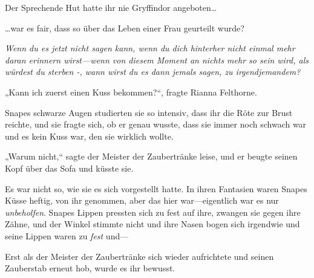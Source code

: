 Der Sprechende Hut hatte ihr nie Gryffindor angeboten…

…war es fair, dass so über das Leben einer Frau geurteilt wurde?

\emph{Wenn du es jetzt nicht sagen kann, wenn du dich hinterher nicht einmal mehr daran erinnern wirst—wenn von diesem Moment an nichts mehr so sein wird, als würdest du sterben -, wann wirst du es dann jemals sagen, zu irgendjemandem?}

„Kann ich zuerst einen Kuss bekommen?“, fragte Rianna Felthorne.

Snapes schwarze Augen studierten sie so intensiv, dass ihr die Röte zur Brust reichte, und sie fragte sich, ob er genau wusste, dass sie immer noch schwach war und es kein Kuss war, den sie wirklich wollte.

„Warum nicht,“ sagte der Meister der Zaubertränke leise, und er beugte seinen Kopf über das Sofa und küsste sie.

Es war nicht so, wie sie es sich vorgestellt hatte. In ihren Fantasien waren Snapes Küsse heftig, von ihr genommen, aber das hier war—eigentlich war es nur \emph{unbeholfen}. Snapes Lippen pressten sich zu fest auf ihre, zwangen sie gegen ihre Zähne, und der Winkel stimmte nicht und ihre Nasen bogen sich irgendwie und seine Lippen waren zu \emph{fest} und—

Erst als der Meister der Zaubertränke sich wieder aufrichtete und seinen Zauberstab erneut hob, wurde es ihr bewusst.

